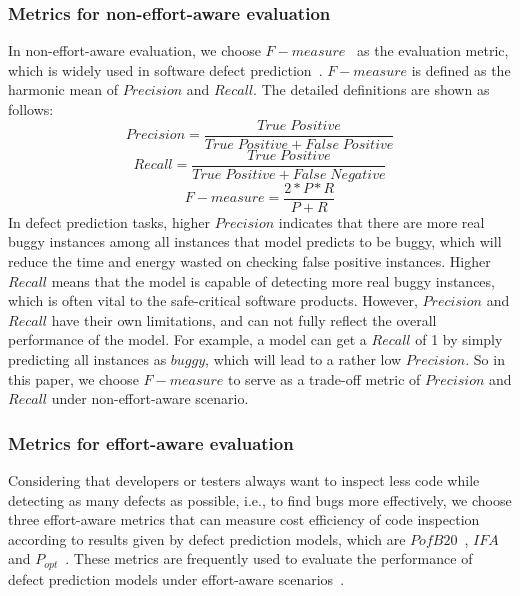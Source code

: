 \documentclass[journal]{IEEEtran}
\begin{document}
\subsubsection{Metrics for non-effort-aware evaluation}
In non-effort-aware evaluation, we choose $F-measure$~\cite{jiang2008techniques} as the evaluation metric, which is widely used in software defect prediction~\cite{wang2018deep,fan2019deep,jing2014dictionary,menzies2006data}. $F-measure$ is defined as the harmonic mean of $Precision$ and $Recall$. The detailed definitions are shown as follows:
\begin{equation}
Precision=\frac{True\;Positive}{True\;Positive + False\;Positive}
\end{equation}
\begin{equation}
Recall=\frac{True\;Positive}{True\;Positive + False\;Negative}
\end{equation}
\begin{equation}
F-measure=\frac{2*P*R}{P+R}
\end{equation}
In defect prediction tasks, higher $Precision$ indicates that there are more real buggy instances among all instances that model predicts to be buggy, which will reduce the time and energy wasted on checking false positive instances. Higher $Recall$ means that the model is capable of detecting more real buggy instances, which is often vital to the safe-critical software products. However, $Precision$ and $Recall$ have their own limitations, and can not fully reflect the overall performance of the model. For example, a model can get a $Recall$ of 1 by simply predicting all instances as $buggy$, which will lead to a rather low $Precision$. So in this paper, we choose  $F-measure$ to serve as a trade-off metric of $Precision$ and $Recall$ under non-effort-aware scenario.
\subsubsection{Metrics for effort-aware evaluation}
Considering that developers or testers always want to inspect less code while detecting as many defects as possible, i.e., to find bugs more effectively, we choose three effort-aware metrics that can measure cost efficiency of code inspection according to results given by defect prediction models, which are $PofB20$~\cite{jiang2013personalized}, $IFA$~\cite{huang2017supervised} and $P_{opt}$~\cite{kamei2012large}. These metrics are frequently used to evaluate the performance of defect prediction models under effort-aware scenarios~\cite{wang2018deep,zhou2018far,huang2019revisiting,yang2016effort}.
\end{document}
